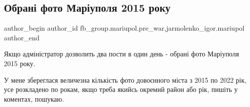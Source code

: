  
 
 
 
 

\subsection{Обрані фото Маріуполя 2015 року}
\label{sec:11_01_2023.fb.fb_group.mariupol.pre_war.3.obran__foto_mar_upol}
 
\ifcmt
 author_begin
   author_id fb_group.mariupol.pre_war,jarmolenko_igor.mariupol
 author_end
\fi

Якщо адміністратор дозволить два пости в один день - обрані фото Маріуполя 2015
року. 

У мене збереглася величезна кількість фото довоєнного міста з 2015 по 2022 рік,
усе розкладено по рокам, якщо треба якийсь окремий район або рік, пишіть у
коментах, пошукаю.

